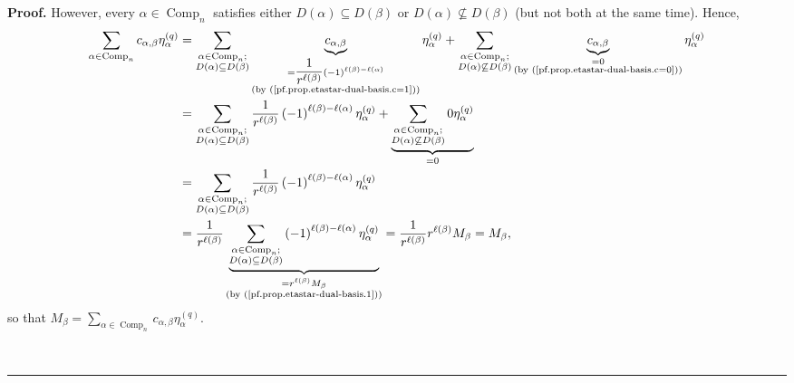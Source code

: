 \documentclass[numbers=enddot,12pt,final,onecolumn,notitlepage]{scrartcl}%
\theoremstyle{definition}
\newenvironment{proof}[1][Proof]{\noindent\textbf{#1.} }{\ \rule{0.5em}{0.5em}}
\let\sumnonlimits\sum
\renewcommand{\sum}{\sumnonlimits\limits}
\newenvironment{verlong}{}{}
\begin{document}
\begin{proof}
\begin{verlong}
However, every $\alpha\in\operatorname*{Comp}\nolimits_{n}$ satisfies either
$D\left(  \alpha\right)  \subseteq D\left(  \beta\right)  $ or $D\left(
\alpha\right)  \not \subseteq D\left(  \beta\right)  $ (but not both at the
same time). Hence,%
\begin{align*}
\sum_{\alpha\in\operatorname*{Comp}\nolimits_{n}}c_{\alpha,\beta}\eta_{\alpha
}^{\left(  q\right)  }  &  =\sum_{\substack{\alpha\in\operatorname*{Comp}%
\nolimits_{n};\\D\left(  \alpha\right)  \subseteq D\left(  \beta\right)
}}\underbrace{c_{\alpha,\beta}}_{\substack{=\dfrac{1}{r^{\ell\left(
\beta\right)  }}\left(  -1\right)  ^{\ell\left(  \beta\right)  -\ell\left(
\alpha\right)  }\\\text{(by (\ref{pf.prop.etastar-dual-basis.c=1}))}}%
}\eta_{\alpha}^{\left(  q\right)  }+\sum_{\substack{\alpha\in
\operatorname*{Comp}\nolimits_{n};\\D\left(  \alpha\right)  \not \subseteq
D\left(  \beta\right)  }}\underbrace{c_{\alpha,\beta}}%
_{\substack{=0\\\text{(by (\ref{pf.prop.etastar-dual-basis.c=0}))}}%
}\eta_{\alpha}^{\left(  q\right)  }\\
&  =\sum_{\substack{\alpha\in\operatorname*{Comp}\nolimits_{n};\\D\left(
\alpha\right)  \subseteq D\left(  \beta\right)  }}\dfrac{1}{r^{\ell\left(
\beta\right)  }}\left(  -1\right)  ^{\ell\left(  \beta\right)  -\ell\left(
\alpha\right)  }\eta_{\alpha}^{\left(  q\right)  }+\underbrace{\sum
_{\substack{\alpha\in\operatorname*{Comp}\nolimits_{n};\\D\left(
\alpha\right)  \not \subseteq D\left(  \beta\right)  }}0\eta_{\alpha}^{\left(
q\right)  }}_{=0}\\
&  =\sum_{\substack{\alpha\in\operatorname*{Comp}\nolimits_{n};\\D\left(
\alpha\right)  \subseteq D\left(  \beta\right)  }}\dfrac{1}{r^{\ell\left(
\beta\right)  }}\left(  -1\right)  ^{\ell\left(  \beta\right)  -\ell\left(
\alpha\right)  }\eta_{\alpha}^{\left(  q\right)  }\\
&  =\dfrac{1}{r^{\ell\left(  \beta\right)  }}\underbrace{\sum
_{\substack{\alpha\in\operatorname*{Comp}\nolimits_{n};\\D\left(
\alpha\right)  \subseteq D\left(  \beta\right)  }}\left(  -1\right)
^{\ell\left(  \beta\right)  -\ell\left(  \alpha\right)  }\eta_{\alpha
}^{\left(  q\right)  }}_{\substack{=r^{\ell\left(  \beta\right)  }M_{\beta
}\\\text{(by (\ref{pf.prop.etastar-dual-basis.1}))}}}=\dfrac{1}{r^{\ell\left(
\beta\right)  }}r^{\ell\left(  \beta\right)  }M_{\beta}=M_{\beta},
\end{align*}
so that $M_{\beta}=\sum_{\alpha\in\operatorname*{Comp}\nolimits_{n}}%
c_{\alpha,\beta}\eta_{\alpha}^{\left(  q\right)  }$.
\end{verlong}


\end{proof}
\end{document}
